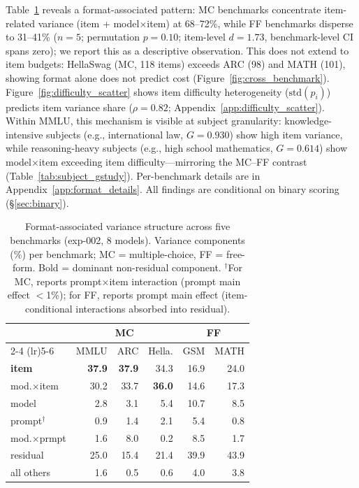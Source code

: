 Table~\ref{tab:cross_benchmark} reveals a format-associated pattern: MC benchmarks concentrate item-related variance (item + model$\times$item) at 68--72\%, while FF benchmarks disperse to 31--41\% ($n = 5$; permutation $p = 0.10$; item-level $d = 1.73$, benchmark-level CI spans zero); we report this as a descriptive observation. This does not extend to item budgets: HellaSwag (MC, 118 items) exceeds ARC (98) and MATH (101), showing format alone does not predict cost (Figure~\ref{fig:cross_benchmark}). Figure~\ref{fig:difficulty_scatter} shows item difficulty heterogeneity ($\text{std}(p_i)$) predicts item variance share ($\rho = 0.82$; Appendix~\ref{app:difficulty_scatter}). Within MMLU, this mechanism is visible at subject granularity: knowledge-intensive subjects (e.g., international law, $G = 0.930$) show high item variance, while reasoning-heavy subjects (e.g., high school mathematics, $G = 0.614$) show model$\times$item exceeding item difficulty---mirroring the MC--FF contrast (Table~\ref{tab:subject_gstudy}). Per-benchmark details are in Appendix~\ref{app:format_details}. All findings are conditional on binary scoring (\S\ref{sec:binary}).

\begin{table}[t]
\centering
\caption{Format-associated variance structure across five benchmarks (exp-002, 8 models). Variance components (\%) per benchmark; MC = multiple-choice, FF = free-form. Bold = dominant non-residual component. $^\dagger$For MC, reports prompt$\times$item interaction (prompt main effect $<$1\%); for FF, reports prompt main effect (item-conditional interactions absorbed into residual).}
\label{tab:cross_benchmark}
\scriptsize
\begin{tabular}{l rrr rr}
\toprule
 & \multicolumn{3}{c}{MC} & \multicolumn{2}{c}{FF} \\
\cmidrule(lr){2-4} \cmidrule(lr){5-6}
 & MMLU & ARC & Hella. & GSM & MATH \\
\midrule
\textbf{item} & \textbf{37.9} & \textbf{37.9} & 34.3 & 16.9 & 24.0 \\
mod.$\times$item & 30.2 & 33.7 & \textbf{36.0} & 14.6 & 17.3 \\
model & 2.8 & 3.1 & 5.4 & 10.7 & 8.5 \\
prompt$^\dagger$ & 0.9 & 1.4 & 2.1 & 5.4 & 0.8 \\
mod.$\times$prmpt & 1.6 & 8.0 & 0.2 & 8.5 & 1.7 \\
residual & 25.0 & 15.4 & 21.4 & 39.9 & 43.9 \\
all others & 1.6 & 0.5 & 0.6 & 4.0 & 3.8 \\
\bottomrule
\end{tabular}
\end{table}

